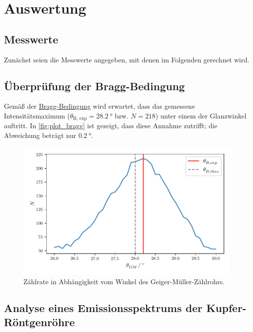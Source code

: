 \section{Auswertung}

\subsection{Messwerte}

Zunächst seien die Messwerte angegeben,
mit denen im Folgenden gerechnet wird.



\subsection{Überprüfung der Bragg-Bedingung}
\label{sec:auswertung:bragg}

Gemäß der \hyperref[eqn:BraggBedingung]{Bragg-Bedingung} wird erwartet,
dass das gemessene Intensitätsmaximum
($\theta_\text{B, exp} = \SI{28.2}{\degree}$ bzw. $N = \num{218}$)
unter einem der Glanzwinkel auftritt.
In \autoref{fig:plot_bragg} ist gezeigt,
dass diese Annahme zutrifft;
die Abweichung beträgt nur $\SI{0.2}{\degree}$.

\begin{figure}
    \centering
    \includegraphics[width=\textwidth]{build/plot_bragg.pdf}
    \caption{Zählrate in Abhängigkeit vom Winkel des Geiger-Müller-Zählrohrs.}
    \label{fig:plot_bragg}
\end{figure}


\subsection{Analyse eines Emissionsspektrums der Kupfer-Röntgenröhre}
\label{sec:auswertung:emissionsspektrum}

